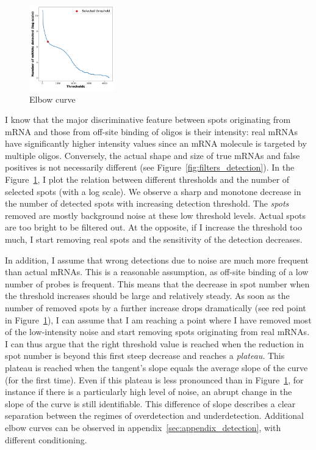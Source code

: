 \begin{figure}
	\begin{center}
		\includegraphics[width=0.33\textwidth]{figures/chapter2/elbow_curve_real}
	\caption[Elbow curve]{Elbow curve}
	\label{fig:elbow_detection}
	\end{center}
\end{figure}

I know that the major discriminative feature between spots originating from \ac{mRNA} and those from off-site binding of oligos is their intensity: real \ac{mRNA}s have significantly higher intensity values since an \ac{mRNA} molecule is targeted by multiple oligos.
Conversely, the actual shape and size of true \ac{mRNA}s and false positives is not necessarily different (see Figure~\ref{fig:filters_detection}).
In the Figure~\ref{fig:elbow_detection}, I plot the relation between different thresholds and the number of selected spots (with a log scale).
We observe a sharp and monotone decrease in the number of detected spots with increasing detection threshold.
The \emph{spots} removed are mostly background noise at these low threshold levels.
Actual spots are too bright to be filtered out.
At the opposite, if I increase the threshold too much, I start removing real spots and the sensitivity of the detection decreases.

In addition, I assume that wrong detections due to noise are much more frequent than actual \ac{mRNA}s.
This is a reasonable assumption, as off-site binding of a low number of probes is frequent.
This means that the decrease in spot number when the threshold increases should be large and relatively steady.
As soon as the number of removed spots by a further increase drops dramatically (see red point in Figure~\ref{fig:elbow_detection}), I can assume that I am reaching a point where I have removed most of the low-intensity noise and start removing spots originating from real \ac{mRNA}s.
I can thus argue that the right threshold value is reached when the reduction in spot number is beyond this first steep decrease and reaches a \emph{plateau}.
This plateau is reached when the tangent's slope equals the average slope of the curve (for the first time).
Even if this plateau is less pronounced than in Figure~\ref{fig:elbow_detection}, for instance if there is a particularly high level of noise, an abrupt change in the slope of the curve is still identifiable.
This difference of slope describes a clear separation between the regimes of overdetection and underdetection.
Additional elbow curves can be observed in appendix~\ref{sec:appendix_detection}, with different conditioning.\\

